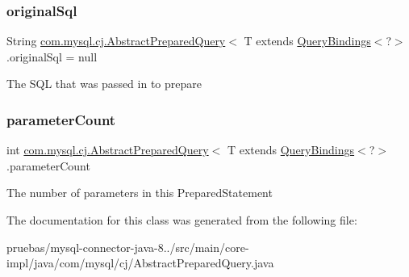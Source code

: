 \subsubsection{\texorpdfstring{original\+Sql}{originalSql}}
{\footnotesize\ttfamily String \mbox{\hyperlink{classcom_1_1mysql_1_1cj_1_1_abstract_prepared_query}{com.\+mysql.\+cj.\+Abstract\+Prepared\+Query}}$<$ T extends \mbox{\hyperlink{interfacecom_1_1mysql_1_1cj_1_1_query_bindings}{Query\+Bindings}}$<$?$>$.original\+Sql = null\hspace{0.3cm}{\ttfamily [protected]}}

The S\+QL that was passed in to \textquotesingle{}prepare\textquotesingle{} \mbox{\label{classcom_1_1mysql_1_1cj_1_1_abstract_prepared_query_a52a040d3c51f2a35b9c257edf897c6f0}} 
\subsubsection{\texorpdfstring{parameter\+Count}{parameterCount}}
{\footnotesize\ttfamily int \mbox{\hyperlink{classcom_1_1mysql_1_1cj_1_1_abstract_prepared_query}{com.\+mysql.\+cj.\+Abstract\+Prepared\+Query}}$<$ T extends \mbox{\hyperlink{interfacecom_1_1mysql_1_1cj_1_1_query_bindings}{Query\+Bindings}}$<$?$>$.parameter\+Count\hspace{0.3cm}{\ttfamily [protected]}}

The number of parameters in this Prepared\+Statement 

The documentation for this class was generated from the following file\+:\begin{DoxyCompactItemize}
\item 
pruebas/mysql-\/connector-\/java-\/8../src/main/core-\/impl/java/com/mysql/cj/Abstract\+Prepared\+Query.\+java\end{DoxyCompactItemize}
